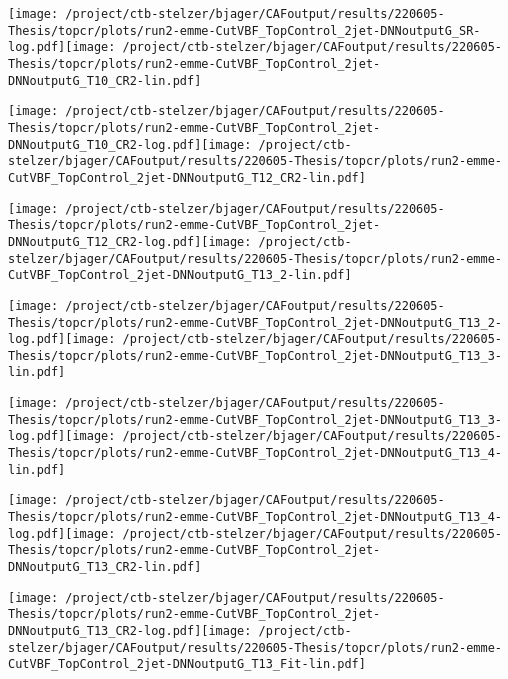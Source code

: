 \documentclass{article}
\begin{document}
\texttt{[image: /project/ctb-stelzer/bjager/CAFoutput/results/220605-Thesis/topcr/plots/run2-emme-CutVBF\_TopControl\_2jet-DNNoutputG\_SR-log.pdf]}\texttt{[image: /project/ctb-stelzer/bjager/CAFoutput/results/220605-Thesis/topcr/plots/run2-emme-CutVBF\_TopControl\_2jet-DNNoutputG\_T10\_CR2-lin.pdf]}

\texttt{[image: /project/ctb-stelzer/bjager/CAFoutput/results/220605-Thesis/topcr/plots/run2-emme-CutVBF\_TopControl\_2jet-DNNoutputG\_T10\_CR2-log.pdf]}\texttt{[image: /project/ctb-stelzer/bjager/CAFoutput/results/220605-Thesis/topcr/plots/run2-emme-CutVBF\_TopControl\_2jet-DNNoutputG\_T12\_CR2-lin.pdf]}

\texttt{[image: /project/ctb-stelzer/bjager/CAFoutput/results/220605-Thesis/topcr/plots/run2-emme-CutVBF\_TopControl\_2jet-DNNoutputG\_T12\_CR2-log.pdf]}\texttt{[image: /project/ctb-stelzer/bjager/CAFoutput/results/220605-Thesis/topcr/plots/run2-emme-CutVBF\_TopControl\_2jet-DNNoutputG\_T13\_2-lin.pdf]}

\texttt{[image: /project/ctb-stelzer/bjager/CAFoutput/results/220605-Thesis/topcr/plots/run2-emme-CutVBF\_TopControl\_2jet-DNNoutputG\_T13\_2-log.pdf]}\texttt{[image: /project/ctb-stelzer/bjager/CAFoutput/results/220605-Thesis/topcr/plots/run2-emme-CutVBF\_TopControl\_2jet-DNNoutputG\_T13\_3-lin.pdf]}

\texttt{[image: /project/ctb-stelzer/bjager/CAFoutput/results/220605-Thesis/topcr/plots/run2-emme-CutVBF\_TopControl\_2jet-DNNoutputG\_T13\_3-log.pdf]}\texttt{[image: /project/ctb-stelzer/bjager/CAFoutput/results/220605-Thesis/topcr/plots/run2-emme-CutVBF\_TopControl\_2jet-DNNoutputG\_T13\_4-lin.pdf]}

\texttt{[image: /project/ctb-stelzer/bjager/CAFoutput/results/220605-Thesis/topcr/plots/run2-emme-CutVBF\_TopControl\_2jet-DNNoutputG\_T13\_4-log.pdf]}\texttt{[image: /project/ctb-stelzer/bjager/CAFoutput/results/220605-Thesis/topcr/plots/run2-emme-CutVBF\_TopControl\_2jet-DNNoutputG\_T13\_CR2-lin.pdf]}

\texttt{[image: /project/ctb-stelzer/bjager/CAFoutput/results/220605-Thesis/topcr/plots/run2-emme-CutVBF\_TopControl\_2jet-DNNoutputG\_T13\_CR2-log.pdf]}\texttt{[image: /project/ctb-stelzer/bjager/CAFoutput/results/220605-Thesis/topcr/plots/run2-emme-CutVBF\_TopControl\_2jet-DNNoutputG\_T13\_Fit-lin.pdf]}
\end{document}
